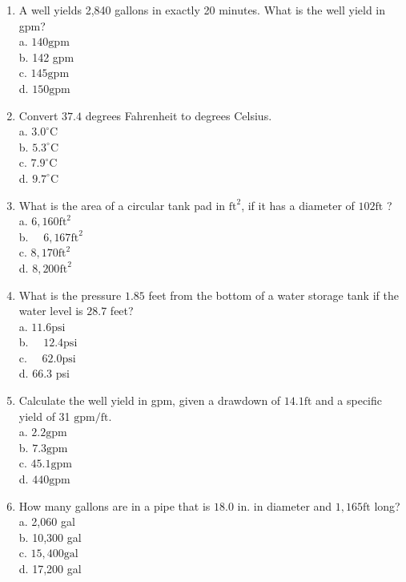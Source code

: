 \documentclass[10pt]{article}
\begin{document}
\begin{enumerate}
  \item A well yields 2,840 gallons in exactly 20 minutes. What is the well yield in gpm?\\
a. $140 \mathrm{gpm}$\\
b. 142 gpm\\
c. $145 \mathrm{gpm}$\\
d. $150 \mathrm{gpm}$

  \item Convert $37.4$ degrees Fahrenheit to degrees Celsius.\\
a. $3.0^{\circ} \mathrm{C}$\\
b. $5.3^{\circ} \mathrm{C}$\\
c. $7.9^{\circ} \mathrm{C}$\\
d. $9.7^{\circ} \mathrm{C}$

  \item What is the area of a circular tank pad in $\mathrm{ft}^{2}$, if it has a diameter of $102 \mathrm{ft}$ ?\\
a. $6,160 \mathrm{ft}^{2}$\\
b. $\quad 6,167 \mathrm{ft}^{2}$\\
c. $8,170 \mathrm{ft}^{2}$\\
d. $8,200 \mathrm{ft}^{2}$

  \item What is the pressure $1.85$ feet from the bottom of a water storage tank if the water level is $28.7$ feet?\\
a. $11.6 \mathrm{psi}$\\
b. $\quad 12.4 \mathrm{psi}$\\
c. $\quad 62.0 \mathrm{psi}$\\
d. $66.3$ psi

  \item Calculate the well yield in gpm, given a drawdown of $14.1 \mathrm{ft}$ and a specific yield of 31 $\mathrm{gpm} / \mathrm{ft}$.\\
a. $2.2 \mathrm{gpm}$\\
b. $7.3 \mathrm{gpm}$\\
c. $45.1 \mathrm{gpm}$\\
d. $440 \mathrm{gpm}$

  \item How many gallons are in a pipe that is $18.0$ in. in diameter and $1,165 \mathrm{ft}$ long?\\
a. 2,060 gal\\
b. 10,300 gal\\
c. $15,400 \mathrm{gal}$\\
d. 17,200 gal 


\end{enumerate}
\end{document}

